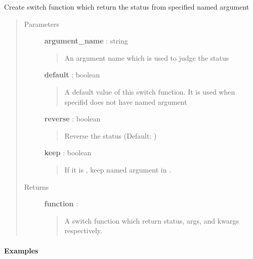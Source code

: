 \documentclass[letterpaper,10pt,english]{sphinxmanual}
\begin{document}
\begin{fulllineitems}
\label{tolerance:tolerance.argument_switch_generator}
Create switch function which return the status from specified named argument
\begin{quote}\begin{description}
\item[{Parameters }] \leavevmode
\textbf{argument\_name} : string
\begin{quote}

An argument name which is used to judge the status
\end{quote}

\textbf{default} : boolean
\begin{quote}

A default value of this switch function.
It is used when specifid  does not have named argument
\end{quote}

\textbf{reverse} : boolean
\begin{quote}

Reverse the status (Default: )
\end{quote}

\textbf{keep} : boolean
\begin{quote}

If it is , keep named argument in .
\end{quote}

\item[{Returns }] \leavevmode
\textbf{function} :
\begin{quote}

A switch function which return status, args, and kwargs respectively.
\end{quote}

\end{description}\end{quote}
\paragraph{Examples}


\end{fulllineitems}
\end{document}
